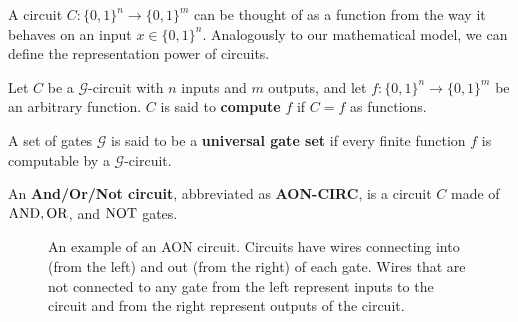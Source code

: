   A circuit $C: \{0, 1\}^n \to \{0, 1\}^m$ can be thought of as a function from the way it behaves on an input $x \in \{0, 1\}^n$. Analogously to our mathematical model, we can define the representation power of circuits. 

  \begin{definition}
    Let $C$ be a $\mathcal{G}$-circuit with $n$ inputs and $m$ outputs, and let $f: \{0, 1\}^n \to \{0, 1\}^m$ be an arbitrary function. $C$ is said to \textbf{compute} $f$ if $C = f$ as functions. 
  \end{definition}

  \begin{definition}
    A set of gates $\mathcal{G}$ is said to be a \textbf{universal gate set} if every finite function $f$ is computable by a $\mathcal{G}$-circuit. 
  \end{definition}

  \begin{definition}
    An \textbf{And/Or/Not circuit}, abbreviated as \textbf{AON-CIRC}, is a circuit $C$ made of $\AND, \OR$, and $\NOT$ gates. 

    \begin{figure}[H]
      \centering 
      \caption{An example of an AON circuit. Circuits have wires connecting into (from the left) and out (from the right) of each gate. Wires that are not connected to any gate from the left represent inputs to the circuit and from the right represent outputs of the circuit. } 
      \label{fig:aon-circ}
    \end{figure}
  \end{definition}


